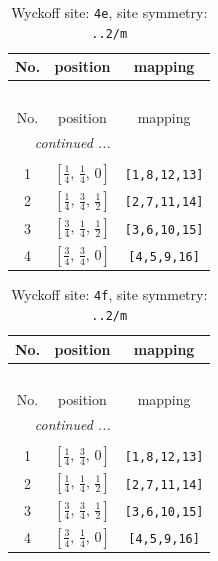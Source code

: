 \documentclass[fleqn,8pt]{jsarticle}
\begin{document}
\renewcommand{\arraystretch}{1.2}
\begin{longtable}{ccc}
\caption{Wyckoff site: {\tt 4e}, site symmetry: {\tt ..2/m}}
 \\
 \hline \hline
No. & position & mapping \\ \hline \endfirsthead

\multicolumn{2}{l}{\tablename\ \thetable{}} \\
 \hline \hline
No. & position & mapping \\ \hline \endhead

 \hline \hline
\multicolumn{2}{r}{\footnotesize\it continued ...} \\ \endfoot

 \hline \hline
\multicolumn{2}{r}{} \\ \endlastfoot

1 & $\left[ \frac{1}{4},\, \frac{1}{4},\, 0 \right]$ & {\tt [1,8,12,13]} \\ \hline
2 & $\left[ \frac{1}{4},\, \frac{3}{4},\, \frac{1}{2} \right]$ & {\tt [2,7,11,14]} \\ \hline
3 & $\left[ \frac{3}{4},\, \frac{1}{4},\, \frac{1}{2} \right]$ & {\tt [3,6,10,15]} \\ \hline
4 & $\left[ \frac{3}{4},\, \frac{3}{4},\, 0 \right]$ & {\tt [4,5,9,16]} \\
\end{longtable}
\renewcommand{\arraystretch}{1.2}
\begin{longtable}{ccc}
\caption{Wyckoff site: {\tt 4f}, site symmetry: {\tt ..2/m}}
 \\
 \hline \hline
No. & position & mapping \\ \hline \endfirsthead

\multicolumn{2}{l}{\tablename\ \thetable{}} \\
 \hline \hline
No. & position & mapping \\ \hline \endhead

 \hline \hline
\multicolumn{2}{r}{\footnotesize\it continued ...} \\ \endfoot

 \hline \hline
\multicolumn{2}{r}{} \\ \endlastfoot

1 & $\left[ \frac{1}{4},\, \frac{3}{4},\, 0 \right]$ & {\tt [1,8,12,13]} \\ \hline
2 & $\left[ \frac{1}{4},\, \frac{1}{4},\, \frac{1}{2} \right]$ & {\tt [2,7,11,14]} \\ \hline
3 & $\left[ \frac{3}{4},\, \frac{3}{4},\, \frac{1}{2} \right]$ & {\tt [3,6,10,15]} \\ \hline
4 & $\left[ \frac{3}{4},\, \frac{1}{4},\, 0 \right]$ & {\tt [4,5,9,16]} \\
\end{longtable}
\end{document}
